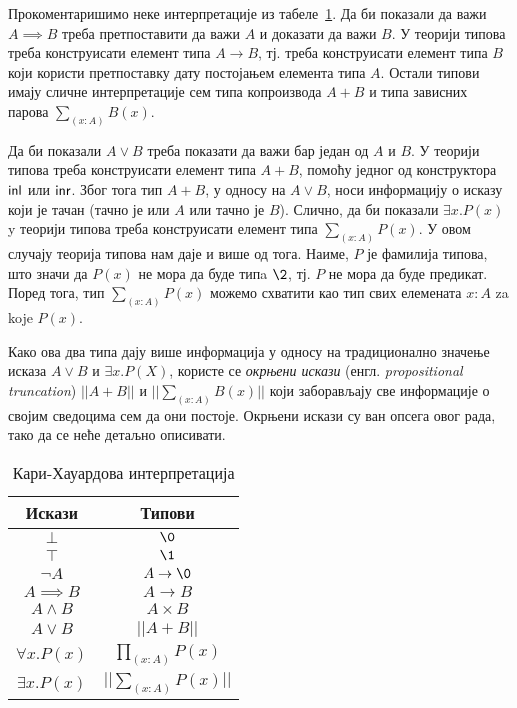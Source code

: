 \documentclass[12pt,oneside]{memoir}
\begin{document}
Прокоментаришимо неке интерпретације из табеле~\ref{table:curry_howard}. Да би показали да важи $A \implies B$ треба претпоставити да важи $A$ и доказати да важи $B$. У теорији типова треба конструисати елемент типа $A \to B$, тј. треба конструисати елемент типа $B$ који користи претпоставку дату постојањем елемента типа $A$. Остали типови имају сличне интерпретације сем типа копроизвода $A + B$ и типа зависних парова $\sum_{(x : A)} B(x)$. 

Да би показали $A \lor B$ треба показати да важи бар један од $A$ и $B$. У теорији типова треба конструисати елемент типа $A + B$, помоћу једног од конструктора $\mathsf{inl}$ или $\mathsf{inr}$. Због тога тип $A + B$, у односу на $A \lor B$, носи информацију о исказу који је тачан (тачно је или $A$ или тачно је $B$). Слично, да би показали $\exists x. P(x)$ y теорији типова треба конструисати елемент типа $\sum_{(x : A)} P(x)$. У овом случају теорија типова нам даје и више од тога. Наиме, $P$ је фамилија типова, што значи да $P(x)$ не мора да буде типa $\2$, тј. $P$ не мора да буде предикат. Поред тога, тип $\sum_{(x : A)} P(x)$ можемо схватити као тип свих елемената $x : A$ za koje $P (x)$. 

Како ова два типа дају више информација у односу на традиционално значење исказа $A \lor B$ и $\exists x. P(X)$, користе се \emph{окрњени искази} (енгл. \emph{propositional truncation}) $|| A + B ||$ и $|| \sum_{(x:A)} B(x) ||$ који заборављају све информације о својим сведоцима сем да они постоје. Окрњени искази су ван опсега овог рада, тако да се неће детаљно описивати.

\begin{table}
    \begin{center}
        \begin{tabular}[c]{c c}
            Искази & Типови \\
            \hline%
            $\bot$ & $\0$ \\
            $\top$ & $\1$ \\
            $\neg A$ & $A \to \0$ \\
            $A \implies B$ & $A \to B$ \\
            $A \land B$ & $A \times B$ \\
            $A \lor B$ & $|| A + B ||$ \\
            $\forall x. P(x)$ & $\prod_{(x : A)} P(x)$ \\
            $\exists x. P(x)$ & $|| \sum_{(x : A)} P(x) ||$
        \end{tabular}
    \end{center}
    \caption{Кари\--Хауардова интерпретација}
    \label{table:curry_howard}
\end{table}
\end{document}
